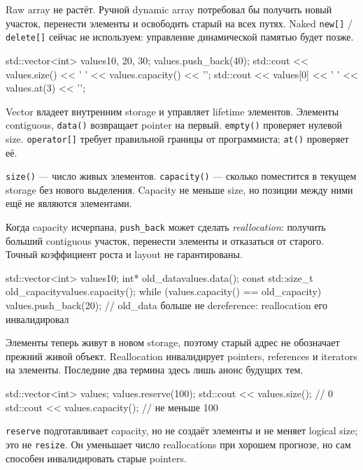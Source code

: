 Raw array не растёт. Ручной dynamic array потребовал бы получить новый
участок, перенести элементы и освободить старый на всех путях. Naked
\texttt{new[]} / \texttt{delete[]} сейчас не используем: управление
динамической памятью будет позже.

\begin{cppcode}
std::vector<int> values{10, 20, 30};
values.push_back(40);
std::cout << values.size() << ' ' << values.capacity() << '\n';
std::cout << values[0] << ' ' << values.at(3) << '\n';
\end{cppcode}

Vector владеет внутренним storage и управляет lifetime элементов. Элементы
contiguous, \texttt{data()} возвращает pointer на первый. \texttt{empty()}
проверяет нулевой size. \texttt{operator[]} требует правильной границы от
программиста; \texttt{at()} проверяет её.

\begin{definition}
\texttt{size()} --- число живых элементов. \texttt{capacity()} --- сколько
поместится в текущем storage без нового выделения. Capacity не меньше size,
но позиции между ними ещё не являются элементами.
\end{definition}

Когда capacity исчерпана, \texttt{push\_back} может сделать
\emph{reallocation}: получить больший contiguous участок, перенести элементы
и отказаться от старого. Точный коэффициент роста и layout не гарантированы.

\begin{cppcode}
std::vector<int> values{10};
int* old_data{values.data()};
const std::size_t old_capacity{values.capacity()};
while (values.capacity() == old_capacity) {
    values.push_back(20);
}
// old_data больше не dereference: reallocation его инвалидировал
\end{cppcode}

Элементы теперь живут в новом storage, поэтому старый адрес не обозначает
прежний живой объект. Reallocation инвалидирует pointers, references и
iterators на элементы. Последние два термина здесь лишь анонс будущих тем.

\begin{cppcode}
std::vector<int> values;
values.reserve(100);
std::cout << values.size();     // 0
std::cout << values.capacity(); // не меньше 100
\end{cppcode}

\texttt{reserve} подготавливает capacity, но не создаёт элементы и не меняет
logical size; это не \texttt{resize}. Он уменьшает число reallocations при
хорошем прогнозе, но сам способен инвалидировать старые pointers.

